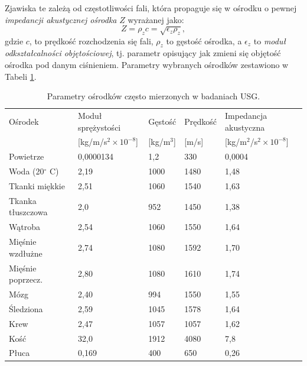 Zjawiska te zależą od częstotliwości fali, która propaguje się w ośrodku o pewnej \textit{impedancji akustycznej ośrodka} $Z$ wyrażanej jako:
\begin{equation}
Z = \rho_z c = \sqrt{\epsilon_z \rho_z},
\end{equation}
gdzie $c$, to prędkość rozchodzenia się fali, $\rho_z$ to gęstość ośrodka, a $\epsilon_z$ to \textit{moduł odkształcalności objętościowej}, tj. parametr opisujący jak zmieni się objętość ośrodka pod danym ciśnieniem. Parametry wybranych ośrodków zestawiono w Tabeli \ref{tab:USG-params}.
\vspace{10px} 
\renewcommand{\arraystretch}{1.2}
\begin{table}[h!]
	\setlength{\tabcolsep}{14pt}
	\centering
	\caption{Parametry ośrodków często mierzonych w badaniach USG.}
	\scriptsize
	\label{tab:USG-params}
	\begin{tabular}{l | l | l | l | l }
		Ośrodek  & Moduł sprężystości  & Gęstość  & Prędkość  & Impedancja akustyczna  \\  
		& [kg/m/s$^2\times10^{-8}$] & [kg/m$^3$] & [m/s] & [kg/m$^2$/s$^2\times10^{-8}$] \\ \hline \hline
		Powietrze   & 0,0000134 & 1,2 & 330 & 0,0004 \\ \hline
		Woda (20$^\circ$ C) & 2,19 & 1000 & 1480 & 1,48  \\ \hline
		Tkanki miękkie & 2,51 & 1060 & 1540 & 1,63  \\ \hline
		Tkanka tłuszczowa & 2,0 & 952 & 1450 & 1,38  \\ \hline
		Wątroba & 2,54 & 1060 & 1550 & 1,64  \\ \hline
		Mięśnie wzdłużne & 2,74 & 1080 & 1592 & 1,70  \\ \hline
		Mięśnie poprzecz. & 2,80 & 1080 & 1610 & 1,74  \\ \hline
		Mózg & 2,40 & 994 & 1550 & 1,55  \\ \hline
		Śledziona & 2,59 & 1045 & 1578 & 1,64  \\ \hline
		Krew & 2,47 & 1057 & 1057 & 1,62  \\ \hline
		Kość & 32,0 & 1912 & 4080 & 7,8  \\ \hline
		Płuca & 0,169 & 400 & 650 & 0,26  \\ \hline
	\end{tabular}
\end{table}
\renewcommand{\arraystretch}{1}

